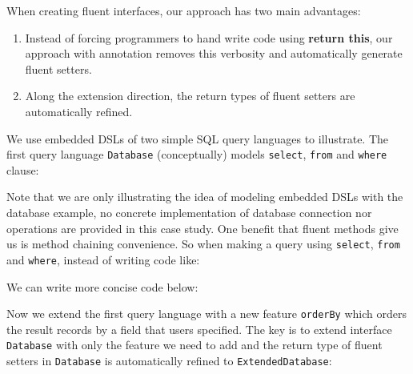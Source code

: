 When creating fluent interfaces, our approach has two main advantages:
\begin{enumerate}
\item Instead of forcing programmers to hand write code using \textbf{return
    this}, our approach with \mixin annotation removes this verbosity and
  automatically generate fluent setters.
\item Along the extension direction, the return types of fluent setters are
  automatically refined.
\end{enumerate} 

\noindent We use embedded DSLs of two simple SQL query languages to illustrate.
The first query language \texttt{Database} (conceptually) models
\texttt{select}, \texttt{from} and \texttt{where} clause:

\noindent Note that we are only illustrating the idea of modeling embedded DSLs
with the database example, no concrete implementation of database connection nor
operations are provided in this case study. One benefit that fluent methods give
us is method chaining convenience. So when making a query using \texttt{select},
\texttt{from} and \texttt{where}, instead of writing code like:

\noindent We can write more concise code below:

\noindent Now we extend the first query language with a new feature
\texttt{orderBy} which orders the result records by a field that users
specified. The key is to extend interface \texttt{Database} with only the
feature we need to add and the return type of fluent setters in
\texttt{Database} is automatically refined to \texttt{ExtendedDatabase}:



